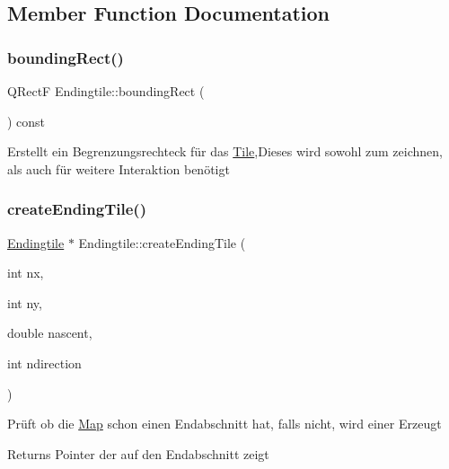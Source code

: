 \subsection{Member Function Documentation}
\mbox{\label{class_endingtile_a96035b6213a6704c781ccde3792e04d8}} 
\subsubsection{\texorpdfstring{bounding\+Rect()}{boundingRect()}}
{\footnotesize\ttfamily Q\+RectF Endingtile\+::bounding\+Rect (\begin{DoxyParamCaption}{ }\end{DoxyParamCaption}) const\hspace{0.3cm}{\ttfamily [virtual]}}

Erstellt ein Begrenzungsrechteck für das \mbox{\hyperlink{class_tile}{Tile}},Dieses wird sowohl zum zeichnen, als auch für weitere Interaktion benötigt \mbox{\label{class_endingtile_aebb90e09ae669f305c980e9e7420c397}} 
\subsubsection{\texorpdfstring{create\+Ending\+Tile()}{createEndingTile()}}
{\footnotesize\ttfamily \mbox{\hyperlink{class_endingtile}{Endingtile}} $\ast$ Endingtile\+::create\+Ending\+Tile (\begin{DoxyParamCaption}\item[{int}]{nx,  }\item[{int}]{ny,  }\item[{double}]{nascent,  }\item[{int}]{ndirection }\end{DoxyParamCaption})\hspace{0.3cm}{\ttfamily [static]}}

Prüft ob die \mbox{\hyperlink{class_map}{Map}} schon einen Endabschnitt hat, falls nicht, wird einer Erzeugt \begin{DoxyReturn}{Returns}
Pointer der auf den Endabschnitt zeigt 
\end{DoxyReturn}
\mbox{\label{class_endingtile_a1e3f8d51207bd2fcd295e88b5e037b03}} 
